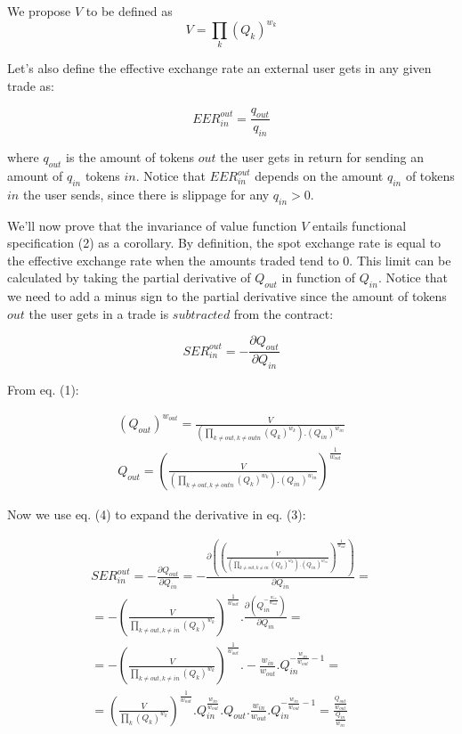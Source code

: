 \documentclass[11pt]{amsart}
\begin{document}
We propose $V$ to be defined as
\begin{equation}
V = \prod_{k}(Q_k)^{w_k} 
\end{equation}

Let's also define the effective exchange rate an external user gets in any given trade as: 

\begin{equation}
EER^{out}_{in} = \frac{q_{out}}{q_{in}}
\end{equation}

where $q_{out}$ is the amount of tokens $out$ the user gets in return for sending an amount of $q_{in}$ tokens $in$. Notice that $EER^{out}_{in}$ depends on the amount $q_{in}$ of tokens $in$ the user sends, since there is slippage for any $q_{in}>0$. 

We'll now prove that the invariance of value function $V$ entails functional specification (2) as a corollary. By definition, the spot exchange rate is equal to the effective exchange rate when the amounts traded tend to 0. This limit can be calculated by taking the partial derivative of $Q_{out}$ in function of $Q_{in}$. Notice that we need to add a minus sign to the partial derivative since the amount of tokens $out$ the user gets in a trade is $subtracted$ from the contract:

\begin{equation}
SER^{out}_{in} = -\frac{\partial Q_{out}}{\partial Q_{in}}
\end{equation}

From eq. (1):

\begin{equation}
\begin{gathered}
(Q_{out})^{w_{out}} =  \frac{V}{\left(\prod_{k\neq out, k\neq outn}(Q_k)^{w_k}\right).(Q_{in})^{w_{in}}}\\
Q_{out} =  \left(\frac{V}{\left(\prod_{k\neq out, k\neq outn}(Q_k)^{w_k}\right).(Q_{in})^{w_{in}}}\right)^\frac{1}{w_{out}}
\end{gathered}
\end{equation}

Now we use eq. (4) to expand the derivative in eq. (3):

\begin{equation}
\begin{gathered}
SER^{out}_{in} = 
-\frac{\partial Q_{out}}{\partial Q_{in}} =
-\frac{\partial{\left(\left(\frac{V}{\left(\prod_{k\neq out, k\neq in}(Q_k)^{w_k}\right).(Q_{in})^{w_{in}}}\right)^\frac{1}{w_{out}}\right)}}{\partial Q_{in}}  =\\
=-\left(\frac{V}{\prod_{k\neq out, k\neq in}(Q_k)^{w_k}}\right)^\frac{1}{w_{out}}
.
\frac{\partial{\left(Q_{in}^{-\frac{w_{in}}{w_{out}}}\right)}}{\partial Q_{in}} =\\
=-\left(\frac{V}{\prod_{k\neq out, k\neq in}(Q_k)^{w_k}}\right)^\frac{1}{w_{out}}
.
-\frac{w_{in}}{w_{out}}.Q_{in}^{-\frac{w_{in}}{w_{out}}-1} =\\
=\left(\frac{V}{\prod_{k}(Q_k)^{w_k}}\right)^\frac{1}{w_{out}}
.Q_{in}^{\frac{w_{in}}{w_{out}}}.Q_{out}
.\frac{w_{in}}{w_{out}}.Q_{in}^{-\frac{w_{in}}{w_{out}}-1} = \frac{\frac{Q_{out}}{w_{out}}}{\frac{Q_{in}}{w_{in}}}
\end{gathered}
\end{equation}
\end{document}
